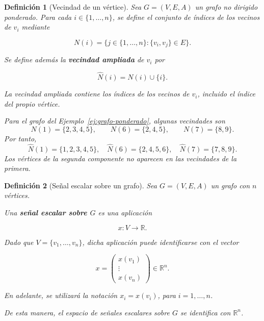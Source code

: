 \documentclass[a4paper,openany,oneside,10pt]{report}
\theoremstyle{pnlTeorema}
\theoremstyle{pnlDefinicion}
\newtheorem{definicion}{Definición}[section]
\theoremstyle{pnlObservacion}
\begin{document}
\begin{definicion}[Vecindad de un vértice]\label{def:vecindad}
Sea \(G=(V,E,A)\) un grafo no dirigido ponderado. Para cada \(i\in\{1,\ldots,n\}\), se define el conjunto de índices de los vecinos de \(v_i\) mediante

\[
N(i)=\{j\in\{1,\ldots,n\}:\{v_i,v_j\}\in E\}.
\]

Se define además la \textbf{vecindad ampliada} de \(v_i\) por

\[
\widehat N(i)=N(i)\cup\{i\}.
\]

La vecindad ampliada contiene los índices de los vecinos de \(v_i\), incluido el índice del propio vértice.

Para el grafo del Ejemplo~\ref{ej:grafo-ponderado}, algunas vecindades son
\[
N(1)=\{2,3,4,5\},\qquad N(6)=\{2,4,5\},\qquad N(7)=\{8,9\}.
\]
Por tanto,
\[
\widehat N(1)=\{1,2,3,4,5\},\quad
\widehat N(6)=\{2,4,5,6\},\quad
\widehat N(7)=\{7,8,9\}.
\]
Los vértices de la segunda componente no aparecen en las vecindades de la primera.
\end{definicion}


\begin{definicion}[Señal escalar sobre un grafo]\label{def:senal-escalar}
Sea \(G=(V,E,A)\) un grafo con \(n\) vértices.

Una \textbf{señal escalar sobre \(G\)} es una aplicación

\[
x:V\longrightarrow\mathbb R.
\]

Dado que \(V=\{v_1,\ldots,v_n\}\), dicha aplicación puede identificarse con el vector

\[
x=
\begin{pmatrix}
x(v_1)\\
\vdots\\
x(v_n)
\end{pmatrix}
\in\mathbb R^n.
\]

En adelante, se utilizará la notación \(x_i=x(v_i)\), para \(i=1,\ldots,n\).

De esta manera, el espacio de señales escalares sobre \(G\) se identifica con \(\mathbb R^n\).
\end{definicion}
\end{document}
